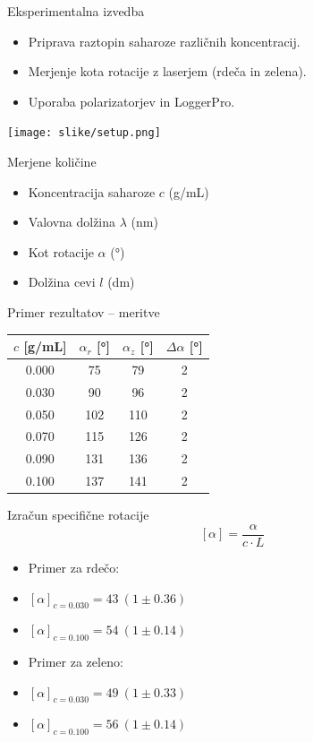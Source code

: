 \documentclass[slovene]{beamer}
\begin{document}
\begin{frame}{Eksperimentalna izvedba}
    \begin{itemize}
        \item Priprava raztopin saharoze različnih koncentracij.
        \item Merjenje kota rotacije z laserjem (rdeča in zelena).
        \item Uporaba polarizatorjev in LoggerPro.
    \end{itemize}
    \begin{center}
        \texttt{[image: slike/setup.png]}
    \end{center}
\end{frame}

\begin{frame}{Merjene količine}
    \begin{itemize}
        \item Koncentracija saharoze $c$ (g/mL)
        \item Valovna dolžina $\lambda$ (nm)
        \item Kot rotacije $\alpha$ (°)
        \item Dolžina cevi $l$ (dm)
    \end{itemize}
\end{frame}

\begin{frame}{Primer rezultatov -- meritve}
    \begin{table}[ht]
    \centering
    \begin{tabular}{cccc}
    \toprule
    $c$ [g/mL] & $\alpha_r$ [°] & $\alpha_z$ [°] & $\Delta\alpha$ [°] \\
    \midrule
    0.000 & 75  & 79  & 2 \\
    0.030 & 90  & 96  & 2 \\
    0.050 & 102 & 110 & 2 \\
    0.070 & 115 & 126 & 2 \\
    0.090 & 131 & 136 & 2 \\
    0.100 & 137 & 141 & 2 \\
    \bottomrule
    \end{tabular}
    \end{table}
\end{frame}

\begin{frame}{Izračun specifične rotacije}
    \[
        [\alpha] = \frac{\alpha}{c \cdot L}
    \]
    \begin{itemize}
        \item Primer za rdečo:
        \item $[\alpha]_{c=0.030} = 43 \ (1 \pm 0.36)$
        \item $[\alpha]_{c=0.100} = 54 \ (1 \pm 0.14)$
    \end{itemize}
    \begin{itemize}
        \item Primer za zeleno:
        \item $[\alpha]_{c=0.030} = 49 \ (1 \pm 0.33)$
        \item $[\alpha]_{c=0.100} = 56 \ (1 \pm 0.14)$
    \end{itemize}
\end{frame}
\end{document}
